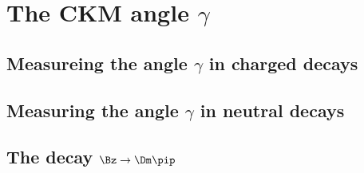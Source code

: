 \chapter{The CKM angle $\gamma$}

\blindtext

\section{Measureing the angle $\gamma$ in charged \B decays}

\Blindtext

\section{Measuring the angle $\gamma$ in neutral \B decays}

\Blindtext

\section{The decay $\Bz\to\Dm\pip$}

\Blindtext

